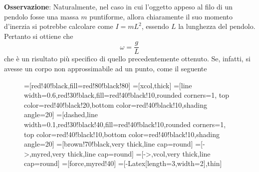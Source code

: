 \documentclass[a4paper]{extarticle}
\begin{document}
\vspace{1em}
\noindent
\textbf{Osservazione}: Naturalmente, nel caso in cui l'oggetto appeso al filo di un pendolo fosse una massa $m$ puntiforme, allora chiaramente il suo momento d'inerzia si potrebbe calcolare come $I=mL^2$, essendo $L$ la lunghezza del pendolo. Pertanto si ottiene che
\[\boxed{\omega=\frac{g}{L}}\]
che è un risultato più specifico di quello precedentemente ottenuto. Se, infatti, si avesse un corpo non approssimabile ad un punto, come il seguente

\begin{figure}[H]
  \centering
  =[red!40!black,fill=red!80!black!80]
  =[xcol,thick]
  =[line width=0.6,red!30!black,fill=red!40!black!10,rounded corners=1,
                    top color=red!40!black!20,bottom color=red!40!black!10,shading angle=20]
  =[dashed,line width=0.1,red!30!black!40,fill=red!40!black!10,rounded corners=1,
                          top color=red!40!black!10,bottom color=red!40!black!10,shading angle=20]
  =[brown!70!black,very thick,line cap=round]
  \def\rope#1{ \draw[black,line width=1.4] #1; \draw[rope,line width=1.1] #1; }
  =[->,myred,very thick,line cap=round]
  =[->,vcol,very thick,line cap=round]
  =[force,myred!40]
  =[-{Latex[length=3,width=2]},thin]
  \def\tick#1#2{\draw[thick] (#1)++(#2:0.12) --++ (#2-180:0.24)}


\end{figure}
\end{document}
